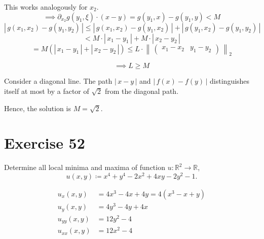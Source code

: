 \documentclass[a4paper]{article}
\theoremstyle{definition}
\newcommand\abs[1]{\left|\,#1\,\right|}
\newcommand\norm[1]{\left\|\,#1\,\right\|}
\begin{document}
This works analogously for $x_2$.
\[ \implies \partial_{x_2} g(y_1, \xi) \cdot (x - y) = g(y_1, x) - g(y_1, y) < M \]
\[ \abs{g(x_1, x_2) - g(y_1, y_2)} \leq \abs{g(x_1, x_2) - g(y_1, x_2)} + \abs{g(y_1, x_2) - g(y_1, y_2)} \]
\[ < M \cdot \abs{x_1 - y_1} + M \cdot \abs{x_2 - y_2} \]
\[ = M \left(\abs{x_1 - y_1} + \abs{x_2 - y_2}\right) \leq L \cdot \norm{\begin{pmatrix} x_1 - x_2 & y_1 - y_2 \end{pmatrix}}_2 \]

\[ \implies L \geq M \]

Consider a diagonal line. The path $\abs{x - y}$ and $\abs{f(x) - f(y)}$ distinguishes itself at most by a factor of $\sqrt{2}$ from the diagonal path.

Hence, the solution is $M = \sqrt{2}$.

\section{Exercise 52}
\begin{ex}
  Determine all local minima and maxima of function $u: \mathbb R^2 \to \mathbb R$,
  \[ u(x,y) \coloneqq x^4 + y^4 - 2x^2 + 4xy - 2y^2 - 1. \]
\end{ex}

\begin{align*}
  u_x(x,y) &= 4x^3 - 4x + 4y = 4(x^3 - x + y) \\
  u_y(x,y) &= 4y^3 - 4y + 4x \\
  u_{yy}(x,y) &= 12y^2 - 4 \\
  u_{xx}(x,y) &= 12x^2 - 4
\end{align*}
\end{document}
